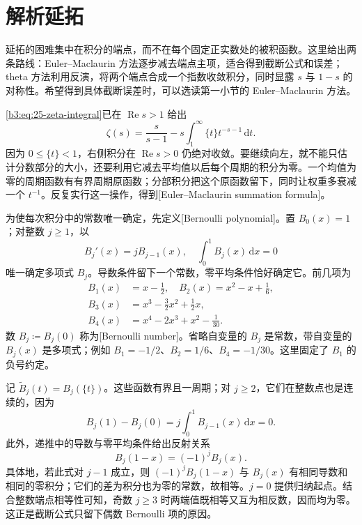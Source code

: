 \section{解析延拓}
\label{b3:sec:2603}

延拓的困难集中在积分的端点，而不在每个固定正实数处的被积函数。这里给出两条路线：Euler--Maclaurin 方法逐步减去端点主项，适合得到截断公式和误差；theta 方法利用反演，将两个端点合成一个指数收敛积分，同时显露 \(s\) 与 \(1-s\) 的对称性。希望得到具体截断误差时，可以选读第一小节的 Euler--Maclaurin 方法。


\eqref{b3:eq:25-zeta-integral}已在 \(\operatorname{Re}s>1\) 给出
\[
 \zeta(s)=\frac{s}{s-1}
      -s\int_1^\infty\{t\}t^{-s-1}\,\mathrm dt.
\]
因为 \(0\le\{t\}<1\)，右侧积分在 \(\operatorname{Re}s>0\) 仍绝对收敛。要继续向左，就不能只估计分数部分的大小，还要利用它减去平均值以后每个周期的积分为零。一个均值为零的周期函数有有界周期原函数；分部积分把这个原函数留下，同时让权重多衰减一个 \(t^{-1}\)。反复实行这一操作，得到[Euler--Maclaurin summation formula]。

\ProseParagraphBreak

为使每次积分中的常数唯一确定，先定义[Bernoulli polynomial]。置 \(B_0(x)=1\)；对整数 \(j\ge1\)，以
\[
 B_j'(x)=jB_{j-1}(x),
 \quad \int_0^1B_j(x)\,\mathrm dx=0
\]
唯一确定多项式 \(B_j\)。导数条件留下一个常数，零平均条件恰好确定它。前几项为
\[
 \begin{aligned}
 B_1(x)&=x-\frac12,\quad
 B_2(x)=x^2-x+\frac16,\\
 B_3(x)&=x^3-\frac32x^2+\frac12x,\\
 B_4(x)&=x^4-2x^3+x^2-\frac1{30}.
 \end{aligned}
\]
数 \(B_j\coloneqq B_j(0)\) 称为[Bernoulli number]。省略自变量的 \(B_j\) 是常数，带自变量的 \(B_j(x)\) 是多项式；例如 \(B_1=-1/2\)、\(B_2=1/6\)、\(B_4=-1/30\)。这里固定了 \(B_1\) 的负号约定。

\ProseParagraphBreak

记 \(\widetilde B_j(t)=B_j(\{t\})\)。这些函数有界且一周期；对 \(j\ge2\)，它们在整数点也是连续的，因为
\[
 B_j(1)-B_j(0)=j\int_0^1B_{j-1}(x)\,\mathrm dx=0.
\]
此外，递推中的导数与零平均条件给出反射关系
\[
 B_j(1-x)=(-1)^jB_j(x).
\]
具体地，若此式对 \(j-1\) 成立，则 \((-1)^jB_j(1-x)\) 与 \(B_j(x)\) 有相同导数和相同的零积分；它们的差为积分也为零的常数，故相等。\(j=0\) 提供归纳起点。结合整数端点相等性可知，奇数 \(j\ge3\) 时两端值既相等又互为相反数，因而均为零。这正是截断公式只留下偶数 Bernoulli 项的原因。

